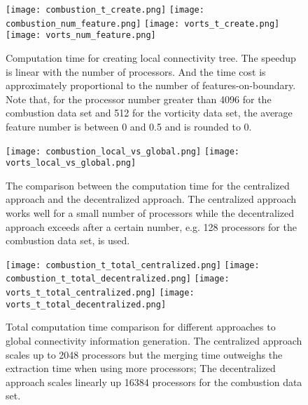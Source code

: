 \begin{figure}[t]
\centering
\texttt{[image: combustion\_t\_create.png]}
\texttt{[image: combustion\_num\_feature.png]}
\texttt{[image: vorts\_t\_create.png]}
\texttt{[image: vorts\_num\_feature.png]}
\caption{Computation time for creating local connectivity tree. The speedup is linear with the number of processors. And the time cost is approximately proportional to the number of features-on-boundary. Note that, for the processor number greater than 4096 for the combustion data set and 512 for the vorticity data set, the average feature number is between 0 and 0.5 and is rounded to 0.}
\label{fig:create-local-graph}
\end{figure}

\begin{figure}[ht]
\centering
\texttt{[image: combustion\_local\_vs\_global.png]}
\texttt{[image: vorts\_local\_vs\_global.png]}
\caption{The comparison between the computation time for the centralized approach and the decentralized approach. The centralized approach works well for a small number of processors while the decentralized approach exceeds after a certain number, e.g. 128 processors for the combustion data set, is used.}
\label{fig:local-vs-global}
\end{figure}


\begin{figure}[t]
\centering
\texttt{[image: combustion\_t\_total\_centralized.png]}
\texttt{[image: combustion\_t\_total\_decentralized.png]}
\texttt{[image: vorts\_t\_total\_centralized.png]}
\texttt{[image: vorts\_t\_total\_decentralized.png]}
\caption{Total computation time comparison for different approaches to global connectivity information generation. The centralized approach scales up to 2048 processors but the merging time outweighs the extraction time when using more processors; The decentralized approach scales linearly up 16384 processors for the combustion data set.}
\label{fig:global-merge}
\end{figure}

